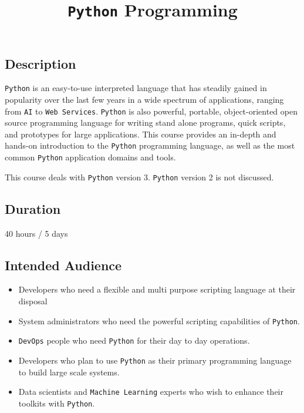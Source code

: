 \documentclass[
]{article}
\title{\texttt{Python} Programming}
\author{}
\date{}
\providecommand{\tightlist}{%
  \setlength{\itemsep}{0pt}\setlength{\parskip}{0pt}}
\begin{document}
\maketitle

\subsection{Description}\label{description}

\texttt{Python} is an easy-to-use interpreted language that has steadily
gained in popularity over the last few years in a wide spectrum of
applications, ranging from \texttt{AI} to \texttt{Web\ Services}.
\texttt{Python} is also powerful, portable, object-oriented open source
programming language for writing stand alone programs, quick scripts,
and prototypes for large applications. This course provides an in-depth
and hands-on introduction to the \texttt{Python} programming language,
as well as the most common \texttt{Python} application domains and
tools.

This course deals with \texttt{Python} version 3. \texttt{Python}
version 2 is not discussed.

\subsection{Duration}\label{duration}

40 hours / 5 days

\subsection{Intended Audience}\label{intended-audience}

\begin{itemize}
\tightlist
\item
  Developers who need a flexible and multi purpose scripting language at
  their disposal
\item
  System administrators who need the powerful scripting capabilities of
  \texttt{Python}.
\item
  \texttt{DevOps} people who need \texttt{Python} for their day to day
  operations.
\item
  Developers who plan to use \texttt{Python} as their primary
  programming language to build large scale systems.
\item
  Data scientists and \texttt{Machine\ Learning} experts who wish to
  enhance their toolkits with \texttt{Python}.
\end{itemize}
\end{document}
